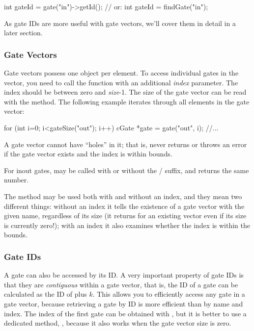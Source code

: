 \begin{cpp}
int gateId = gate("in")->getId();  // or:
int gateId = findGate("in");
\end{cpp}

As gate IDs are more useful with gate vectors, we'll cover them
in detail in a later section.


\subsubsection{Gate Vectors}

Gate vectors possess one  object per element.
To access individual gates in the vector, you need to call
the  function with an additional \textit{index}
parameter. The index should be between zero and \textit{size}-1.
The size of the gate vector can be read with the 
method. The following example iterates through all elements in the
gate vector:

\begin{cpp}
for (int i=0; i<gateSize("out"); i++) {
    cGate *gate = gate("out", i);
    //...
}
\end{cpp}

A gate vector cannot have ``holes'' in it; that is, 
never returns  or throws an error if the gate vector exists
and the index is within bounds.

For inout gates,  may be called with or without
the / suffix, and returns the same number.

The  method may be used both with and without an
index, and they mean two different things: without an index it tells
the existence of a gate vector with the given name, regardless of its
size (it returns  for an existing vector even if its size
is currently zero!); with an index it also examines whether the index
is within the bounds.


\subsubsection{Gate IDs}

A gate can also be accessed by its ID. A very important property of gate IDs
is that they are \textit{contiguous} within a gate vector, that is,
the ID of a gate  can be calculated as the ID of  plus $k$.
This allows you to efficiently access any gate in a gate vector, because
retrieving a gate by ID is more efficient than by name and index.
The index of the first gate can be obtained with ,
but it is better to use a dedicated method, ,
because it also works when the gate vector size is zero.

